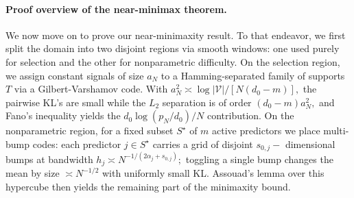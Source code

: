 \documentclass[11pt]{article}
\theoremstyle{plain}
\theoremstyle{definition}
\theoremstyle{plain}
\begin{document}
\paragraph{Proof overview of the near-minimax theorem.} 
We now move on to prove our near-minimaxity result. To that endeavor, we first split the domain into two disjoint regions via smooth windows: one used purely for selection and the other for nonparametric difficulty. On the selection region, we assign constant signals of size $a_N$ to a Hamming-separated family of supports $T$ via a Gilbert-Varshamov code. With $a_N ^2 \asymp \log |\mathcal{V}|/[N(d_0-m)],$ the pairwise KL's are small while the $L_2$ separation is of order $(d_0-m)a_N ^2,$ and Fano's inequality yields the $d_0 \log (p_N/d_0)/N$ contribution. On the nonparametric region, for a fixed subset $S^{\star}$ of $m$ active predictors we place multi-bump codes: each predictor $j \in S^{\star}$ carries a grid of disjoint $s_{0,j}-$ dimensional bumps at bandwidth $h_j \asymp N^{-1/(2 \alpha_j +s_{0,j})};$ toggling a single bump changes the mean by size $\asymp N^{-1/2}$ with uniformly small KL. Assouad's lemma over this hypercube then yields the remaining part of the minimaxity bound.
\end{document}
